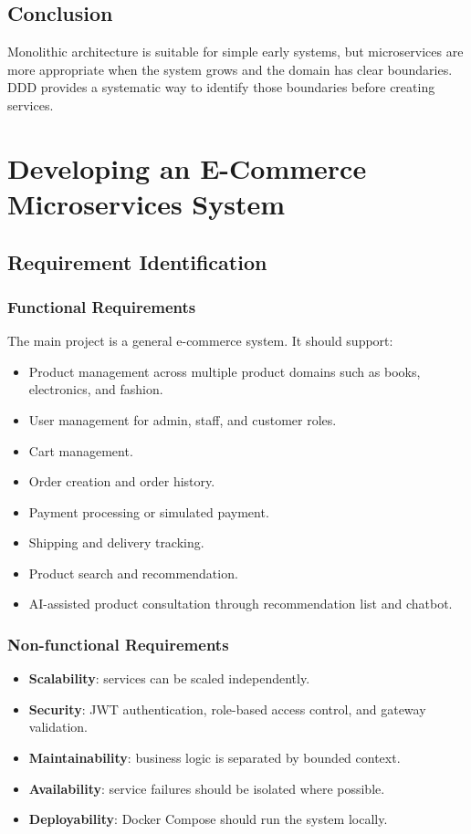\documentclass[12pt,a4paper]{article}
\begin{document}
\subsection{Conclusion}

Monolithic architecture is suitable for simple early systems, but microservices are more appropriate when the system grows and the domain has clear boundaries. DDD provides a systematic way to identify those boundaries before creating services.

\section{Developing an E-Commerce Microservices System}

\subsection{Requirement Identification}

\subsubsection{Functional Requirements}

The main project is a general e-commerce system. It should support:

\begin{itemize}
    \item Product management across multiple product domains such as books, electronics, and fashion.
    \item User management for admin, staff, and customer roles.
    \item Cart management.
    \item Order creation and order history.
    \item Payment processing or simulated payment.
    \item Shipping and delivery tracking.
    \item Product search and recommendation.
    \item AI-assisted product consultation through recommendation list and chatbot.
\end{itemize}

\subsubsection{Non-functional Requirements}

\begin{itemize}
    \item \textbf{Scalability}: services can be scaled independently.
    \item \textbf{Security}: JWT authentication, role-based access control, and gateway validation.
    \item \textbf{Maintainability}: business logic is separated by bounded context.
    \item \textbf{Availability}: service failures should be isolated where possible.
    \item \textbf{Deployability}: Docker Compose should run the system locally.
\end{itemize}
\end{document}

